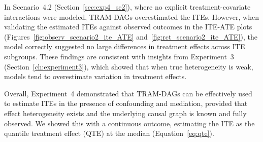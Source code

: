 In Scenario~4.2 (Section~\ref{sec:exp4_sc2}), where no explicit treatment-covariate interactions were modeled, TRAM-DAGs overestimated the ITEs. However, when validating the estimated ITEs against observed outcomes in the ITE-ATE plots (Figures~\ref{fig:observ_scenario2_ite_ATE} and~\ref{fig:rct_scenario2_ite_ATE}), the model correctly suggested no large differences in treatment effects across ITE subgroups. These findings are consistent with insights from Experiment~3 (Section~\ref{ch:experiment3}), which showed that when true heterogeneity is weak, models tend to overestimate variation in treatment effects.

Overall, Experiment~4 demonstrated that TRAM-DAGs can be effectively used to estimate ITEs in the presence of confounding and mediation, provided that effect heterogeneity exists and the underlying causal graph is known and fully observed. We showed this with a continuous outcome, estimating the ITE as the quantile treatment effect (QTE) at the median (Equation~\ref{eq:qte}).






